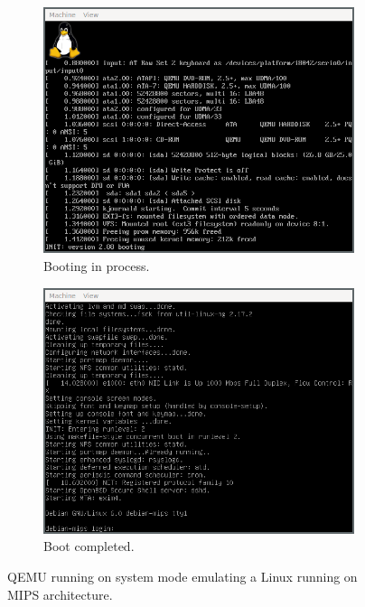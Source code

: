 \begin{figure}[H]
     \centering
     \begin{subfigure}[b]{0.45\textwidth}
         \centering
         \includegraphics[width=\textwidth]{figs/qemu.png}
         \caption{Booting in process.}
         \label{fig:qemu-loading}
     \end{subfigure}
     \hfill
     \begin{subfigure}[b]{0.45\textwidth}
         \centering
         \includegraphics[width=\textwidth]{figs/qemu2.png}
         \caption{Boot completed.}
         \label{fig:qemu-booted}
     \end{subfigure}
        \caption{QEMU running on system mode emulating a Linux running on MIPS architecture.}
        \label{fig:qemu-manual}
\end{figure}

